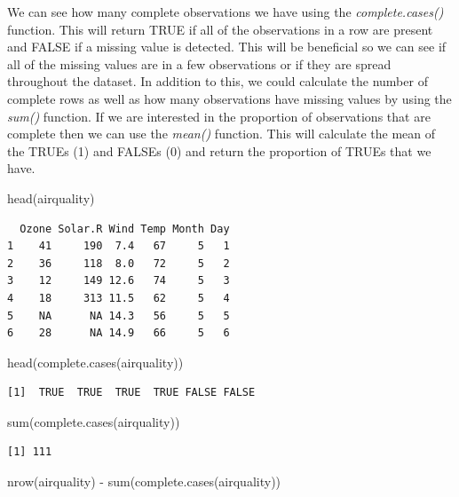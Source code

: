 \documentclass[
  letterpaper,
  DIV=11,
  numbers=noendperiod]{scrreprt}
\newenvironment{Shaded}{\begin{snugshade}}{\end{snugshade}}
\newcommand{\FunctionTok}[1]{\textcolor[rgb]{0.28,0.35,0.67}{#1}}
\newcommand{\NormalTok}[1]{\textcolor[rgb]{0.00,0.23,0.31}{#1}}
\newcommand{\SpecialCharTok}[1]{\textcolor[rgb]{0.37,0.37,0.37}{#1}}
\begin{document}
We can see how many complete observations we have using the
\emph{complete.cases()} function. This will return TRUE if all of the
observations in a row are present and FALSE if a missing value is
detected. This will be beneficial so we can see if all of the missing
values are in a few observations or if they are spread throughout the
dataset. In addition to this, we could calculate the number of complete
rows as well as how many observations have missing values by using the
\emph{sum()} function. If we are interested in the proportion of
observations that are complete then we can use the \emph{mean()}
function. This will calculate the mean of the TRUEs (1) and FALSEs (0)
and return the proportion of TRUEs that we have.

\begin{Shaded}
\begin{Highlighting}[]
\FunctionTok{head}\NormalTok{(airquality)}
\end{Highlighting}
\end{Shaded}

\begin{verbatim}
  Ozone Solar.R Wind Temp Month Day
1    41     190  7.4   67     5   1
2    36     118  8.0   72     5   2
3    12     149 12.6   74     5   3
4    18     313 11.5   62     5   4
5    NA      NA 14.3   56     5   5
6    28      NA 14.9   66     5   6
\end{verbatim}

\begin{Shaded}
\begin{Highlighting}[]
\FunctionTok{head}\NormalTok{(}\FunctionTok{complete.cases}\NormalTok{(airquality))}
\end{Highlighting}
\end{Shaded}

\begin{verbatim}
[1]  TRUE  TRUE  TRUE  TRUE FALSE FALSE
\end{verbatim}

\begin{Shaded}
\begin{Highlighting}[]
\FunctionTok{sum}\NormalTok{(}\FunctionTok{complete.cases}\NormalTok{(airquality))}
\end{Highlighting}
\end{Shaded}

\begin{verbatim}
[1] 111
\end{verbatim}

\begin{Shaded}
\begin{Highlighting}[]
\FunctionTok{nrow}\NormalTok{(airquality) }\SpecialCharTok{{-}} \FunctionTok{sum}\NormalTok{(}\FunctionTok{complete.cases}\NormalTok{(airquality))}
\end{Highlighting}
\end{Shaded}
\end{document}
